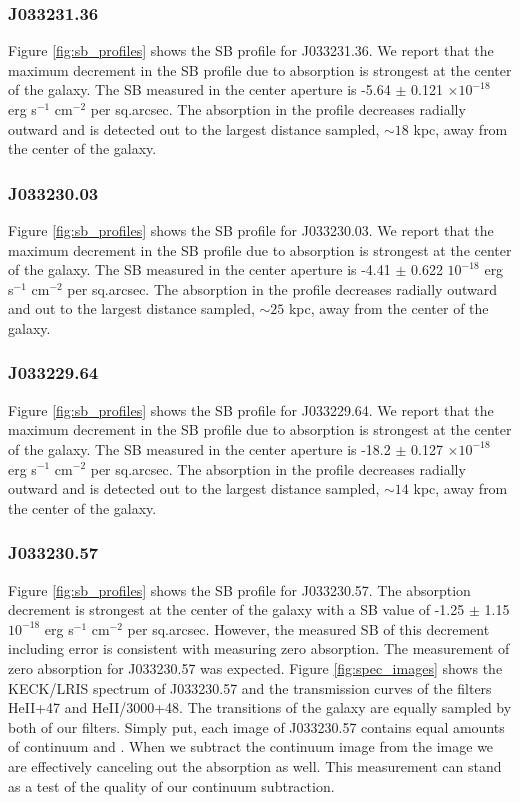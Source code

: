 \documentclass[twocolumn]{aastex61}
\begin{document}
\subsubsection{J033231.36} 
Figure \ref{fig:sb_profiles} shows the SB profile for J033231.36. We report that the maximum decrement in the SB profile due to absorption is strongest at the center of the galaxy. The SB measured in the center aperture is -5.64 $\pm$ 0.121 $\times10^{-18}$ erg s$^{-1}$ cm$^{-2}$ per sq.arcsec. The absorption in the profile decreases radially outward and is detected out to the largest distance sampled, $\sim 18$ kpc, away from the center of the galaxy.

\subsubsection{J033230.03} 
Figure \ref{fig:sb_profiles} shows the SB profile for J033230.03. We report that the maximum decrement in the SB profile due to absorption is strongest at the center of the galaxy. The SB measured in the center aperture is -4.41 $\pm$ 0.622 $10^{-18}$ erg s$^{-1}$ cm$^{-2}$ per sq.arcsec. The absorption in the profile decreases radially outward and out to the largest distance sampled, $\sim 25$ kpc, away from the center of the galaxy.

\subsubsection{J033229.64} 
Figure \ref{fig:sb_profiles} shows the SB profile for J033229.64. We report that the maximum decrement in the SB profile due to absorption is strongest at the center of the galaxy. The SB measured in the center aperture is -18.2 $\pm$ 0.127 $\times10^{-18}$ erg s$^{-1}$ cm$^{-2}$ per sq.arcsec. The absorption in the profile decreases radially outward and is detected out to the largest distance sampled, $\sim 14$ kpc, away from the center of the galaxy.

\subsubsection{J033230.57} 
Figure \ref{fig:sb_profiles} shows the SB profile for J033230.57. The absorption decrement is strongest at the center of the galaxy with a SB value of -1.25 $\pm$ 1.15 $10^{-18}$ erg s$^{-1}$ cm$^{-2}$ per sq.arcsec. However, the measured SB of this decrement including error is consistent with measuring zero absorption. The measurement of zero absorption for J033230.57 was expected. Figure \ref{fig:spec_images} shows the KECK/LRIS spectrum of J033230.57 and the transmission curves of the filters HeII+47 and HeII/3000+48. The  transitions of the galaxy are equally sampled by both of our filters. Simply put, each image of J033230.57 contains equal amounts of continuum and . When we subtract the continuum image from the  image we are effectively canceling out the  absorption as well. This measurement can stand as a test of the quality of our continuum subtraction. \\
\end{document}
